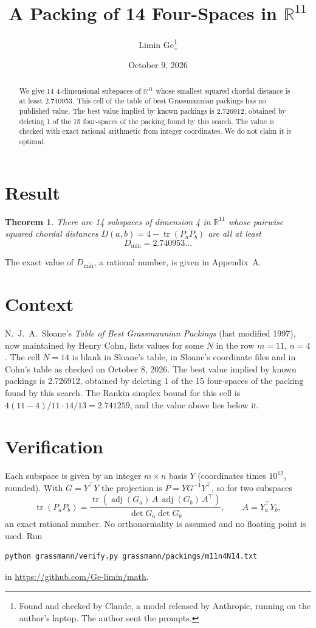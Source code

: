 \documentclass[11pt,a4paper]{article}
\title{A Packing of 14 Four-Spaces in $\mathbb{R}^{11}$}
\author{Limin Ge\thanks{Found and checked by Claude, a model released by Anthropic, running on the author's laptop. The author sent the prompts.}}
\date{October 9, 2026}
\newtheorem*{theorem}{Theorem}
\begin{document}
\maketitle
\begin{abstract}
We give 14 4-dimensional subspaces of $\mathbb{R}^{11}$ whose smallest squared chordal distance is at least 2.740953. This cell of the table of best Grassmannian packings has no published value. The best value implied by known packings is 2.726912, obtained by deleting 1 of the 15 four-spaces of the packing found by this search. The value is checked with exact rational arithmetic from integer coordinates. We do not claim it is optimal.
\end{abstract}

\section{Result}
\begin{theorem}
There are 14 subspaces of dimension 4 in $\mathbb{R}^{11}$ whose pairwise squared chordal distances $D(a,b) = 4 - \operatorname{tr}(P_aP_b)$ are all at least
\[ D_{\min} = 2.740953\ldots \]
\end{theorem}
The exact value of $D_{\min}$, a rational number, is given in Appendix~A.


\section{Context}
N.~J.~A.~Sloane's \emph{Table of Best Grassmannian Packings} (last modified 1997), now maintained by Henry Cohn, lists values for some $N$ in the row $m=11$, $n=4$. The cell $N=14$ is blank in Sloane's table, in Sloane's coordinate files and in Cohn's table as checked on October 8, 2026. The best value implied by known packings is 2.726912, obtained by deleting 1 of the 15 four-spaces of the packing found by this search. The Rankin simplex bound for this cell is $4(11-4)/11\cdot 14/13 = 2.741259$, and the value above lies below it.


\section{Verification}
Each subspace is given by an integer $m\times n$ basis $Y$ (coordinates times $10^{12}$, rounded). With $G=Y^\top Y$ the projection is $P=YG^{-1}Y^\top$, so for two subspaces
\[ \operatorname{tr}(P_aP_b)=\frac{\operatorname{tr}(\operatorname{adj}(G_a)\,A\,\operatorname{adj}(G_b)\,A^\top)}{\det G_a\det G_b},\qquad A=Y_a^\top Y_b, \]
an exact rational number. No orthonormality is assumed and no floating point is used. Run
\begin{verbatim}
python grassmann/verify.py grassmann/packings/m11n4N14.txt
\end{verbatim}
in \url{https://github.com/Ge-limin/math}.
\end{document}

